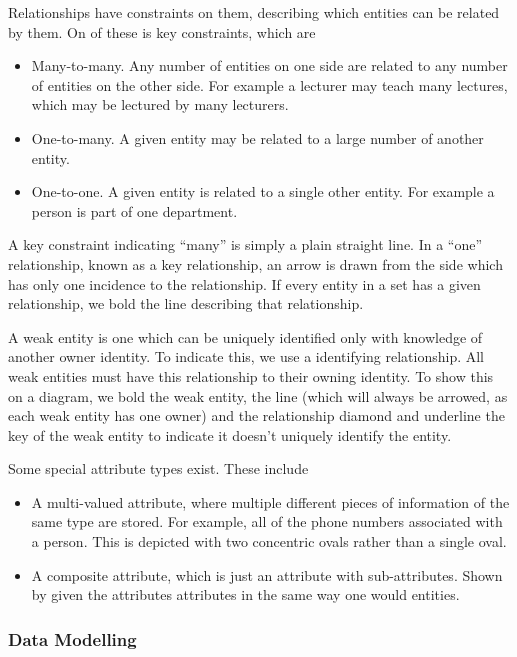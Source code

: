 \documentclass[12pt]{report}
\begin{document}
\begin{flushleft}
Relationships have constraints on them, describing which entities can be
related by them. On of these is key constraints, which are
\begin{itemize}
    \item Many-to-many. Any number of entities on one side are related to any
        number of entities on the other side. For example a lecturer may teach
        many lectures, which may be lectured by many lecturers.
    \item One-to-many. A given entity may be related to a large number of
        another entity.
    \item One-to-one. A given entity is related to a single other entity. For
        example a person is part of one department.
\end{itemize}
A key constraint indicating ``many'' is simply a plain straight line. In a
``one'' relationship, known as a key relationship, an arrow is drawn from the
side which has only one incidence to the relationship. If every entity in a set
has a given relationship, we bold the line describing that relationship. \par
A weak entity is one which can be uniquely identified only with knowledge of
another owner identity. To indicate this, we use a identifying relationship. All
weak entities must have this relationship to their owning identity. To show this
on a diagram, we bold the weak entity, the line (which will always be arrowed,
as each weak entity has one owner) and the relationship diamond and underline
the key of the weak entity to indicate it doesn't uniquely identify the entity.
\par
Some special attribute types exist. These include
\begin{itemize}
    \item A multi-valued attribute, where multiple different pieces of
        information of the same type are stored. For example, all of the phone
        numbers associated with a person. This is depicted with two concentric
        ovals rather than a single oval.
    \item A composite attribute, which is just an attribute with sub-attributes.
        Shown by given the attributes attributes in the same way one would
        entities.
\end{itemize}

\subsubsection*{Data Modelling}


\end{flushleft}
\end{document}

